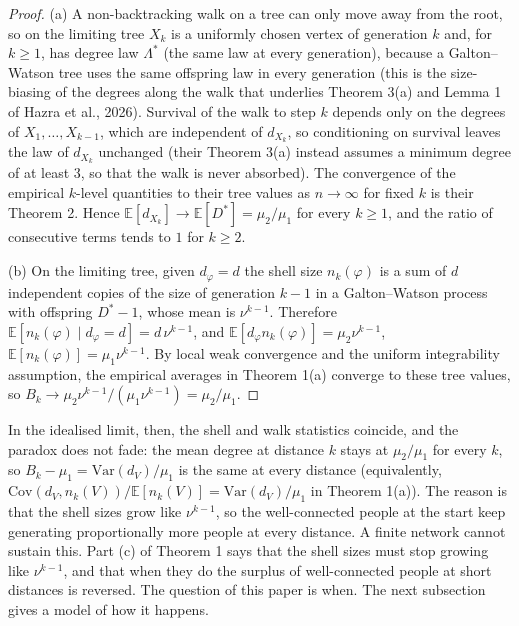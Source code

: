 \documentclass{nws}
\begin{document}
\begin{proof}
(a) A non-backtracking walk on a tree can only move away from the root, so on
the limiting tree $X_k$ is a uniformly chosen vertex of generation $k$ and,
for $k\ge1$, has degree law $\Lambda^*$ (the same law at every generation),
because a Galton--Watson tree uses the same offspring law in every
generation (this is the size-biasing of the degrees along the walk that underlies
Theorem 3(a) and Lemma 1 of Hazra et al., 2026). Survival of the walk to step $k$ depends only on the degrees of
$X_1,\ldots,X_{k-1}$, which are independent of $d_{X_k}$, so conditioning on survival leaves the law of $d_{X_k}$
unchanged (their Theorem 3(a) instead assumes a minimum degree of at least 3, so that the walk is never absorbed). The convergence of the empirical $k$-level quantities to their
tree values as $n\to\infty$ for fixed $k$ is their Theorem 2. Hence $\mathbb{E}[d_{X_k}]\to\mathbb{E}[D^*]=\mu_2/\mu_1$ for
every $k\ge1$, and the ratio of consecutive terms tends to $1$ for $k\ge2$.

(b) On the limiting tree, given $d_\varphi=d$ the shell size $n_k(\varphi)$ is
a sum of $d$ independent copies of the size of generation $k-1$ in a
Galton--Watson process with offspring $D^*-1$, whose mean is $\nu^{k-1}$.
Therefore $\mathbb{E}[n_k(\varphi)\mid d_\varphi=d]=d\,\nu^{k-1}$, and
$\mathbb{E}[d_\varphi n_k(\varphi)]=\mu_2\nu^{k-1}$,
$\mathbb{E}[n_k(\varphi)]=\mu_1\nu^{k-1}$. By local weak convergence and the
uniform integrability assumption, the empirical averages in Theorem 1(a) converge to these tree values, so
$B_k\to\mu_2\nu^{k-1}/(\mu_1\nu^{k-1})=\mu_2/\mu_1$.
\end{proof}

In the idealised limit, then, the shell and walk statistics coincide, and the paradox does not fade: the mean degree at distance $k$ stays at $\mu_2/\mu_1$ for every $k$, so $B_k-\mu_1=\mathrm{Var}(d_V)/\mu_1$ is the same at every distance (equivalently, $\mathrm{Cov}(d_V,n_k(V))/\mathbb{E}[n_k(V)]=\mathrm{Var}(d_V)/\mu_1$ in Theorem 1(a)). The reason is that the shell sizes grow like $\nu^{k-1}$, so the well-connected people at the start keep generating proportionally more people at every distance. A finite network cannot sustain this. Part (c) of Theorem 1 says that the shell sizes must stop growing like $\nu^{k-1}$, and that when they do the surplus of well-connected people at short distances is reversed. The question of this paper is when. The next subsection gives a model of how it happens.
\end{document}
